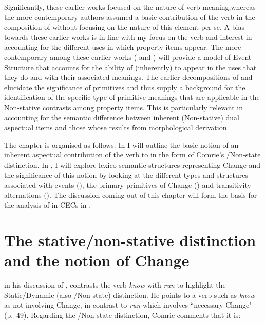 Significantly, these earlier works focused on the nature of verb
meaning,\linebreak whereas the more contemporary authors assumed a basic
contribution of the verb in the composition of  without focusing
on the nature of this element per se.  A bias towards these
earlier works is in line with my focus on the verb and interest in
accounting for the different uses in which property items appear.  The
more contemporary among these earlier works
(\citealt{Pustejovsky1988,Pustejovsky1991} and \citealt{Grimshaw1990}) will
provide a model of Event Structure that accounts for the ability of
(inherently)  to appear in the uses that they do
and with their associated meanings.  The earlier decompositions of
\citet{McCawley1968,Carter1976} and \citet{Dowty1979}
elucidate the significance of primitives and thus supply a background
for the identification of the specific type of primitive meanings that
are applicable in the Non-stative contrasts among property items.
This is particularly relevant in accounting for the semantic
difference between inherent (Non-stative) dual aspectual items and
those whose  results from morphological
derivation.

The chapter is organised as follows: In  I will
outline the basic notion of an inherent aspectual contribution of the
verb to  in the form of Comrie’s \slash Non-state distinction.
In , I will explore lexico-semantic structures
representing Change and the significance of this notion by looking at
the different types and structures associated with events
(), the primary primitives of Change
() and transitivity alternations
().  The discussion coming out of this chapter will
form the basis for the analysis of  in CECs in
.

\section{The stative/non-stative distinction and the notion of
  Change}\label{sec:4.1} %

\citet{Comrie1976,} in his discussion of , contrasts the verb
\textit{know} with \textit{run} to highlight the Static\slash Dynamic (also
\slash Non-state) distinction. He points to a verb such as \textit{know} as not involving Change, in contrast to \textit{run} which involves ``necessary
Change" (p.~49).  Regarding the \slash Non-state distinction, Comrie
comments that it is:

